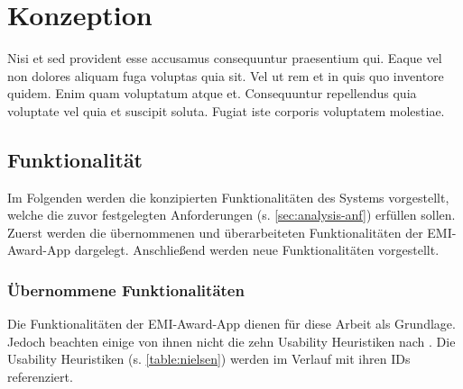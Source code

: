 \chapter{Konzeption}

Nisi et sed provident esse accusamus consequuntur praesentium qui. Eaque vel non dolores aliquam fuga voluptas quia sit. Vel ut rem et in quis quo inventore quidem. Enim quam voluptatum atque et. Consequuntur repellendus quia voluptate vel quia et suscipit soluta. Fugiat iste corporis voluptatem molestiae.

\section{Funktionalität}

Im Folgenden werden die konzipierten Funktionalitäten des Systems vorgestellt,
welche die zuvor festgelegten Anforderungen (s. \autoref{sec:analysis-anf})
erfüllen sollen. Zuerst werden die übernommenen und überarbeiteten
Funktionalitäten der EMI-Award-App dargelegt. Anschließend werden neue
Funktionalitäten vorgestellt.

\subsection{Übernommene Funktionalitäten}

Die Funktionalitäten der EMI-Award-App dienen für diese Arbeit als Grundlage.
Jedoch beachten einige von ihnen nicht die zehn Usability Heuristiken nach
\textcite{Nielsen1994}. Die Usability Heuristiken (s. \autoref{table:nielsen})
werden im Verlauf mit ihren IDs referenziert.

